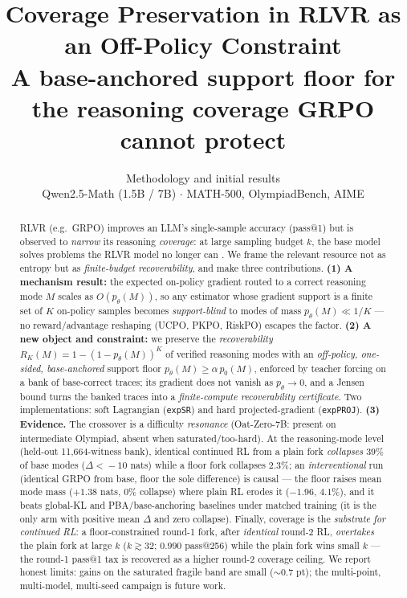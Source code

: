 \documentclass[11pt]{article}
\title{\textbf{Coverage Preservation in RLVR as an Off-Policy Constraint}\\
\large A base-anchored support floor for the reasoning coverage GRPO cannot protect}
\author{Methodology and initial results \\ \small Qwen2.5-Math (1.5B / 7B) $\cdot$ MATH-500, OlympiadBench, AIME}
\date{}
\theoremstyle{definition}
\begin{document}
\maketitle

\begin{abstract}
RLVR (e.g.\ GRPO) improves an LLM's single-sample accuracy (pass@1) but is observed to \emph{narrow}
its reasoning \emph{coverage}: at large sampling budget $k$, the base model solves problems the
RLVR model no longer can \citep{yue2025}. We frame the relevant resource not as entropy but as
\emph{finite-budget recoverability}, and make three contributions. \textbf{(1) A mechanism result:}
the expected on-policy gradient routed to a correct reasoning mode $M$ scales as $O(p_\theta(M))$, so
any estimator whose gradient support is a finite set of $K$ on-policy samples becomes
\emph{support-blind} to modes of mass $p_\theta(M)\!\ll\!1/K$ --- no reward/advantage reshaping
(UCPO, PKPO, RiskPO) escapes the factor. \textbf{(2) A new object and constraint:} we preserve the
\emph{recoverability} $R_K(M)=1-(1-p_\theta(M))^K$ of verified reasoning modes with an
\emph{off-policy, one-sided, base-anchored} support floor $p_\theta(M)\ge\alpha\,p_0(M)$, enforced by
teacher forcing on a bank of base-correct traces; its gradient does not vanish as $p_\theta\to0$, and
a Jensen bound turns the banked traces into a \emph{finite-compute recoverability certificate}. Two
implementations: soft Lagrangian (\texttt{expSR}) and hard projected-gradient (\texttt{expPROJ}).
\textbf{(3) Evidence.} The crossover is a difficulty \emph{resonance} (Oat-Zero-7B: present on
intermediate Olympiad, absent when saturated/too-hard). At the reasoning-mode level (held-out
11{,}664-witness bank), identical continued RL from a plain fork \emph{collapses} $39\%$ of base
modes ($\Delta<\!-10$ nats) while a floor fork collapses $2.3\%$; an \emph{interventional} run
(identical GRPO from base, floor the sole difference) is causal --- the floor raises mean mode mass
($+1.38$ nats, $0\%$ collapse) where plain RL erodes it ($-1.96$, $4.1\%$), and it beats global-KL
and PBA/base-anchoring baselines under matched training (it is the only arm with positive mean $\Delta$
and zero collapse). Finally, coverage is the \emph{substrate for continued RL}: a floor-constrained
round-1 fork, after \emph{identical} round-2 RL, \emph{overtakes} the plain fork at large $k$
($k\!\gtrsim\!32$; $0.990$ pass@256) while the plain fork wins small $k$ --- the round-1 pass@1 tax is
recovered as a higher round-2 coverage ceiling. We report honest limits: gains on the saturated
fragile band are small ($\sim\!0.7$ pt); the multi-point, multi-model, multi-seed campaign is future work.
\end{abstract}
\end{document}
